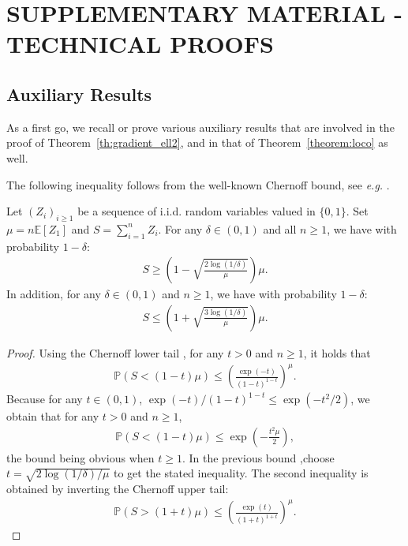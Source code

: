 \section*{SUPPLEMENTARY MATERIAL - TECHNICAL PROOFS}







\subsection*{Auxiliary Results}
As a first go, we recall or prove various auxiliary results that are involved in the proof of Theorem~\ref{th:gradient_ell2}, and in that of Theorem~\ref{theorem:loco} as well.
\medskip

The following inequality follows from the well-known Chernoff bound, see \textit{e.g.} \citep{boucheronConcentrationInequalitiesNonasymptotic2013}.

\begin{lemma}\label{lemma=chernoff}
Let $(Z_i)_{i\geq 1}$ be a sequence of i.i.d. random variables valued in $\{0,1\}$. Set $\mu =  n \mathbb E [Z_1]$ and $S = \sum_{i=1} ^n Z_i $.   For any $\delta \in (0,1)$ and all $n\geq 1$, we have with probability $1-\delta$:
\begin{align*}
S \geq \left(1- \sqrt{ \frac{2 \log(1/\delta)  }{  \mu} } \right) \mu  .
\end{align*}
 In addition, for any $\delta \in (0,1)$ and $n\geq 1$, we have with probability $1-\delta$:
\begin{align*}
S \leq \left(1 +  \sqrt{ \frac{3 \log(1/\delta)   }{  \mu} }  \right) \mu  .
\end{align*}
\end{lemma}

\begin{proof}
Using the Chernoff lower tail \citep{boucheronConcentrationInequalitiesNonasymptotic2013}, for any $t > 0 $ and $n\geq 1$, it holds that
\begin{align*}
\mathbb P \left( S < (1-t ) \mu \right) \leq \left( \frac{\exp(-t) }{ (1- t) ^{1-t} }  \right)^\mu.
\end{align*}
Because for any $t\in (0,1)$, ${\exp(-t) } / { (1- t) ^{1-t} } \leq  \exp( - {t^2  }/{2} ) $, we obtain that for any $t > 0 $ and $n\geq 1$,
\begin{align*}
\mathbb P \left( S < (1-t ) \mu \right) \leq \exp\left( - \frac{t^2 \mu }{2} \right) ,
\end{align*}
the bound being obvious when $t\geq 1$. In the previous bound ,choose $t = \sqrt{ {2 \log(1/\delta)  } /{  \mu}}$ to get the stated inequality. The second inequality is obtained by inverting the Chernoff upper tail:
\begin{align*}
\mathbb P \left( S > (1+t ) \mu \right) \leq \left( \frac{\exp(t) }{ (1+ t) ^{1+ t} }  \right)^\mu.
\end{align*}
\end{proof}

